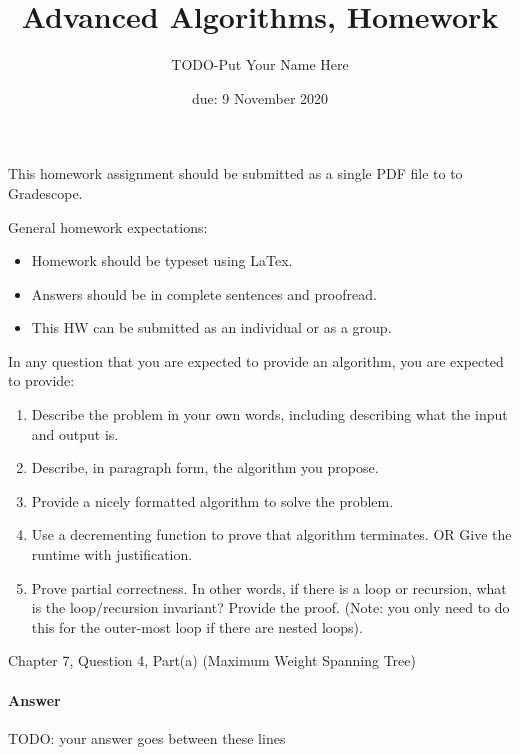 \documentclass{article}
\title{Advanced Algorithms, Homework \hwnum}
\author{TODO-Put Your Name Here}
\date{due: 9 November 2020}
\begin{document}
\maketitle

This homework assignment should be
submitted as a single PDF file to to Gradescope.

General homework expectations:
\begin{itemize}
    \item Homework should be typeset using LaTex.
    \item Answers should be in complete sentences and proofread.
    \item This HW can be submitted as an individual or as a group.
\end{itemize}

In any question that you are expected to provide an algorithm, you are
expected to provide:
\begin{enumerate}
    \item Describe the problem in your own words, including
        describing what the input and output is.
    \item Describe, in paragraph form, the algorithm you propose.
    \item Provide a nicely formatted algorithm to solve the problem.
    \item Use a decrementing function to prove that algorithm terminates.
            OR  Give the runtime with justification.
    \item Prove partial correctness.  In other words, if there is a loop or
        recursion, what is the loop/recursion invariant? Provide the proof.
        (Note: you only need to do this for the outer-most loop if there are
        nested loops).
\end{enumerate}

\nextprob
{}

Chapter 7, Question 4, Part(a) (Maximum Weight Spanning Tree)

\paragraph{Answer}


TODO: your answer goes between these lines



\nextprob
{}
\end{document}
